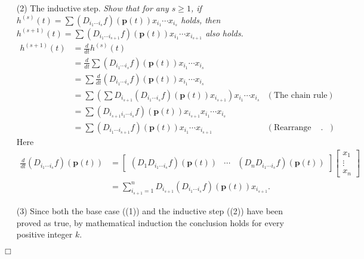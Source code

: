 \documentclass{article}
\begin{document}
\begin{enumerate}
\item[(2)]
  The inductive step.
  \emph{Show that for any $s \geq 1$,
  if $h^{(s)}(t) = \sum (D_{i_1 \cdots i_s}f)(\mathbf{p}(t)) x_{i_1} \cdots x_{i_s}$ holds,
  then $h^{(s+1)}(t)
  = \sum (D_{i_1 \cdots i_{s+1}}f)(\mathbf{p}(t)) x_{i_1} \cdots x_{i_{s+1}}$ also holds.}
  \begin{align*}
    h^{(s+1)}(t)
    &= \frac{d}{dt} h^{(s)}(t) \\
    &= \frac{d}{dt} \sum
      (D_{i_1 \cdots i_s}f)(\mathbf{p}(t)) x_{i_1} \cdots x_{i_s} \\
    &= \sum
      \frac{d}{dt} (D_{i_1 \cdots i_s}f)(\mathbf{p}(t)) x_{i_1} \cdots x_{i_s} \\
    &= \sum
      \left( \sum D_{i_{s+1}} (D_{i_1 \cdots i_s}f)(\mathbf{p}(t))x_{i_{s+1}} \right)
      x_{i_1} \cdots x_{i_s}
      &(\text{The chain rule}) \\
    &= \sum
      (D_{i_{s+1} i_1 \cdots i_s}f)(\mathbf{p}(t)) x_{i_{s+1}} x_{i_1} \cdots x_{i_{s}} \\
    &= \sum (D_{i_1 \cdots i_{s+1}}f)(\mathbf{p}(t)) x_{i_1} \cdots x_{i_{s+1}}
      &(\text{Rearrange index}).
  \end{align*}
  Here
  \begin{align*}
    \frac{d}{dt} (D_{i_1 \cdots i_s}f)(\mathbf{p}(t))
    &= \begin{bmatrix}
      (D_1 D_{i_1 \cdots i_s}f)(\mathbf{p}(t)) & \cdots &
        (D_n D_{i_1 \cdots i_s}f)(\mathbf{p}(t))
    \end{bmatrix}
    \begin{bmatrix}
      x_1 \\
      \vdots \\
      x_n
    \end{bmatrix} \\
    &= \sum_{i_{s+1}=1}^{n} D_{i_{s+1}} (D_{i_1 \cdots i_s}f)(\mathbf{p}(t))x_{i_{s+1}}.
  \end{align*}

\item[(3)]
  Since both the base case ((1)) and the inductive step ((2)) have been proved as true,
  by mathematical induction the conclusion holds for every positive integer $k$.
\end{enumerate}
$\Box$ \\
\end{document}
